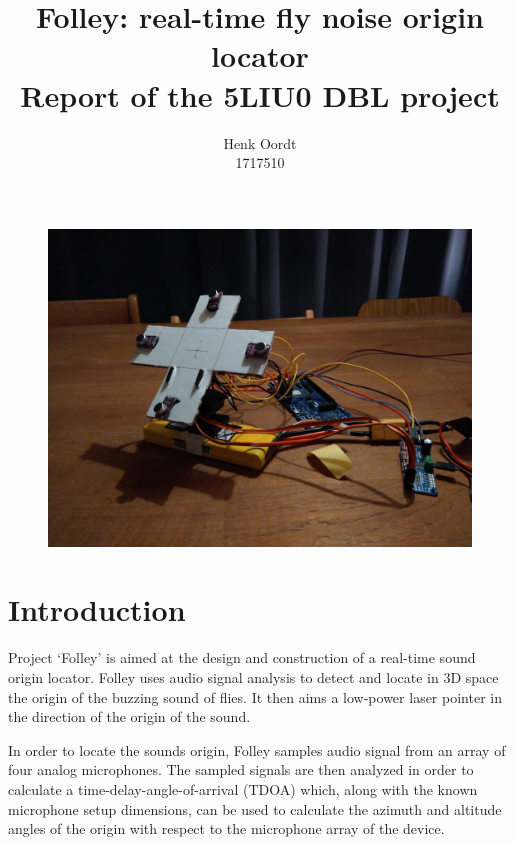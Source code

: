\documentclass[a4paper]{article}
\begin{document}
\title{{Folley: real-time fly noise origin locator} \\\large {Report of the 5LIU0 DBL project}}
\author{{Henk Oordt} \hfill
\\
{1717510} \hfill}

\begin{figure}
    \begin{center}
        \includegraphics[width=\linewidth]{assets/device.jpeg}
    \end{center}
\end{figure}

\maketitle
\newpage

\section{Introduction}
Project `Folley' is aimed at the design and construction of a real-time sound origin locator. Folley uses audio signal analysis to detect and locate in 3D space the origin of the buzzing sound of flies. It then aims a low-power laser pointer in the direction of the origin of the sound.

In order to locate the sounds origin, Folley samples audio signal from an array of four analog microphones. The sampled signals are then analyzed in order to calculate a time-delay-angle-of-arrival (TDOA) \cite{6327613} which, along with the known microphone setup dimensions, can be used to calculate the azimuth and altitude angles of the origin with respect to the microphone array of the device.
\end{document}

